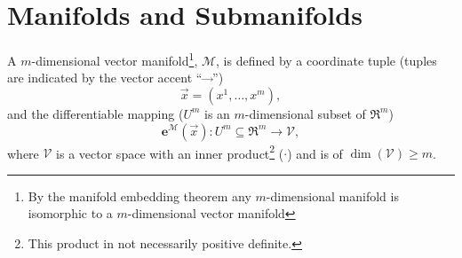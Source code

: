 \documentclass[12pt]{report}
\newcommand{\bm}[1]{\boldsymbol{#1}}
\newcommand{\lp}{\left (}
\newcommand{\rp}{\right )}
\newcommand{\f}[2]{{#1}\lp {#2} \rp}
\newcommand{\paren}[1]{\lp {#1} \rp}
\newcommand{\be}{\begin{equation}}
\newcommand{\ee}{\end{equation}}
\begin{document}
\section{Manifolds and Submanifolds}\label{sect_manifold}

A $m$-dimensional vector manifold\footnote{By the manifold embedding theorem any $m$-dimensional
manifold is isomorphic to a $m$-dimensional vector manifold}, $\mathcal{M}$, is defined by a
coordinate tuple (tuples are indicated by the vector accent ``$\vec{\;\;\;}$'')
\be
    \vec{x} = \paren{x^{1},\dots,x^{m}},
\ee
and the differentiable mapping ($U^{m}$ is an $m$-dimensional subset of $\Re^{m}$)
\be
    \f{\bm{e}^{\mathcal{M}}}{\vec{x}}\colon U^{m}\subseteq\Re^{m}\rightarrow \mathcal{V},
\ee
where $\mathcal{V}$ is a vector space with an inner product\footnote{This product in not necessarily positive definite.} ($\cdot$) and is of $\f{\dim}{\mathcal{V}} \ge m$.
\end{document}
